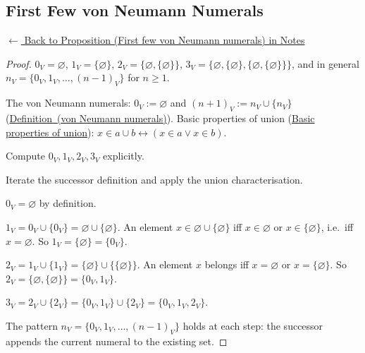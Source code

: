 
\subsection*{First Few von Neumann Numerals}
\label{prf:vn-first-few}

\begin{remark*}[Return]
\hyperref[prop:vn-first-few]{$\leftarrow$ Back to Proposition (First few von Neumann numerals) in Notes}
\end{remark*}

\begin{proof}
\Claim $0_V = \varnothing$, $1_V = \{\varnothing\}$, $2_V = \{\varnothing, \{\varnothing\}\}$, $3_V = \{\varnothing, \{\varnothing\}, \{\varnothing,\{\varnothing\}\}\}$, and in general $n_V = \{0_V, 1_V, \ldots, (n-1)_V\}$ for $n \geq 1$.

\Given The von Neumann numerals: $0_V := \varnothing$ and $(n+1)_V := n_V \cup
\{n_V\}$ (\hyperref[def:vn-numerals]{Definition~(von Neumann numerals)}).
Basic properties of union
(\hyperref[prop:union-basics]{Basic properties of union}): $x \in a \cup b
\leftrightarrow (x \in a \lor x \in b)$.

\Goal Compute $0_V, 1_V, 2_V, 3_V$ explicitly.

\Strategy Iterate the successor definition and apply the union characterisation.

\medskip
$0_V = \varnothing$ by definition.

$1_V = 0_V \cup \{0_V\} = \varnothing \cup \{\varnothing\}$.
An element $x \in \varnothing \cup \{\varnothing\}$ iff $x \in \varnothing$ or
$x \in \{\varnothing\}$, i.e.\ iff $x = \varnothing$. So $1_V = \{\varnothing\}
= \{0_V\}$.

$2_V = 1_V \cup \{1_V\} = \{\varnothing\} \cup \{\{\varnothing\}\}$.
An element $x$ belongs iff $x = \varnothing$ or $x = \{\varnothing\}$. So
$2_V = \{\varnothing, \{\varnothing\}\} = \{0_V, 1_V\}$.

$3_V = 2_V \cup \{2_V\} = \{0_V, 1_V\} \cup \{2_V\} = \{0_V, 1_V, 2_V\}$.

The pattern $n_V = \{0_V, 1_V, \ldots, (n-1)_V\}$ holds at each step: the
successor appends the current numeral to the existing set. \AsReq
\end{proof}

